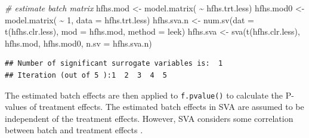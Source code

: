\documentclass[
]{book}
\newenvironment{Shaded}{\begin{snugshade}}{\end{snugshade}}
\newcommand{\AttributeTok}[1]{\textcolor[rgb]{0.77,0.63,0.00}{#1}}
\newcommand{\CommentTok}[1]{\textcolor[rgb]{0.56,0.35,0.01}{\textit{#1}}}
\newcommand{\DecValTok}[1]{\textcolor[rgb]{0.00,0.00,0.81}{#1}}
\newcommand{\FunctionTok}[1]{\textcolor[rgb]{0.00,0.00,0.00}{#1}}
\newcommand{\NormalTok}[1]{#1}
\newcommand{\OtherTok}[1]{\textcolor[rgb]{0.56,0.35,0.01}{#1}}
\newcommand{\SpecialCharTok}[1]{\textcolor[rgb]{0.00,0.00,0.00}{#1}}
\newcommand{\StringTok}[1]{\textcolor[rgb]{0.31,0.60,0.02}{#1}}
\begin{document}
\begin{Shaded}
\begin{Highlighting}[]
\CommentTok{\# estimate batch matrix}
\NormalTok{hfhs.mod }\OtherTok{\textless{}{-}} \FunctionTok{model.matrix}\NormalTok{( }\SpecialCharTok{\textasciitilde{}}\NormalTok{ hfhs.trt.less)}
\NormalTok{hfhs.mod0 }\OtherTok{\textless{}{-}} \FunctionTok{model.matrix}\NormalTok{( }\SpecialCharTok{\textasciitilde{}} \DecValTok{1}\NormalTok{, }\AttributeTok{data =}\NormalTok{ hfhs.trt.less)}
\NormalTok{hfhs.sva.n }\OtherTok{\textless{}{-}} \FunctionTok{num.sv}\NormalTok{(}\AttributeTok{dat =} \FunctionTok{t}\NormalTok{(hfhs.clr.less), }\AttributeTok{mod =}\NormalTok{ hfhs.mod, }
                     \AttributeTok{method =} \StringTok{\textquotesingle{}leek\textquotesingle{}}\NormalTok{)}
\NormalTok{hfhs.sva }\OtherTok{\textless{}{-}} \FunctionTok{sva}\NormalTok{(}\FunctionTok{t}\NormalTok{(hfhs.clr.less), hfhs.mod, hfhs.mod0, }\AttributeTok{n.sv =}\NormalTok{ hfhs.sva.n)}
\end{Highlighting}
\end{Shaded}

\begin{verbatim}
## Number of significant surrogate variables is:  1 
## Iteration (out of 5 ):1  2  3  4  5
\end{verbatim}

The estimated batch effects are then applied to \texttt{f.pvalue()} to calculate the P-values of treatment effects. The estimated batch effects in SVA are assumed to be independent of the treatment effects. However, SVA considers some correlation between batch and treatment effects \citep{wang2020managing}.

\begin{Shaded}
\end{Shaded}
\end{document}
